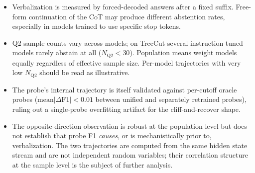 \begin{itemize}
\item Verbalization is measured by forced-decoded answers after a fixed
suffix. Free-form continuation of the CoT may produce different
abstention rates, especially in models trained to use specific stop
tokens.

\item Q2 sample counts vary across models; on TreeCut several
instruction-tuned models rarely abstain at all
($N_{\text{Q2}}<30$). Population means weight models equally regardless
of effective sample size. Per-model trajectories with very low $N_{\text{Q2}}$
should be read as illustrative.

\item The probe's internal trajectory is itself validated against per-cutoff
oracle probes ($\mathrm{mean}|\Delta\mathrm{F1}|<0.01$ between unified and
separately retrained probes), ruling out a single-probe overfitting
artifact for the cliff-and-recover shape.

\item The opposite-direction observation is robust at the population level
but does not establish that probe F1 \emph{causes}, or is mechanistically
prior to, verbalization. The two trajectories are computed from
the same hidden state stream and are not independent random variables;
their correlation structure at the sample level is the subject of
further analysis.
\end{itemize}

